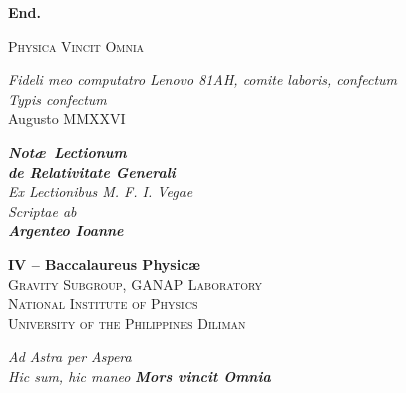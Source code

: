 \vfill
\begin{flushright}
	{\Large
		\textbf{End.}
	}	
\end{flushright}
\begin{center}
	{
		\large
		\textsc{Physica Vincit Omnia}
	}
\end{center}
\newpage
{}
\thispagestyle{empty}
\begin{center}
	\textit{Fideli meo computatro Lenovo 81AH, comite laboris, confectum}\\[0.5em]
	\textit{Typis \LaTeXe confectum}\\[1em]
	Augusto MMXXVI
\end{center}
\vspace*{1in}
\begin{center}
	{\LARGE
		\textit{\textbf{
			Not\ae\ Lectionum\\
			de Relativitate Generali
		}}\\[2em]
	}
		\textit{Ex Lectionibus M. F. I. Vegae}\\[1em]
		\textit{Scriptae ab\\[0.5em] {\large\textbf{Argenteo Ioanne}}}\\[2in]
\end{center}
\vfill
\begin{center}
	\textbf{IV – Baccalaureus Physic\ae}\\[0.5em]
	\textsc{Gravity Subgroup, GANAP Laboratory}\\[0.5em]
	{\large \textsc{National Institute of Physics}}\\
	{\large \textsc{University of the Philippines Diliman}}
\end{center}

\newpage
\thispagestyle{empty}
\begin{center}
	{
		\Large
		\textit{Ad Astra per Aspera}\\[2.5in]
		\textit{Hic sum, hic maneo}
		\vfill
		\textit{\textbf{Mors vincit Omnia}}
	}
\end{center}

